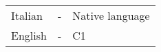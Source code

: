 \textcolor{sidebartext}{
	\begin{tabular}{lll}
		Italian&-&Native language\\
		English&-&C1
	\end{tabular}
}